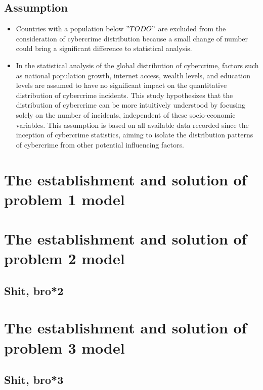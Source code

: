 \documentclass[12pt]{article}
\begin{document}
	\subsection{Assumption}\label{subsec:assumption} %
		\begin{itemize}
			\item Countries with a population below \( "TODO" \) are excluded from the consideration of cybercrime distribution because
				a small change of number could bring a significant difference to statistical analysis.
			\item In the statistical analysis of the global distribution of cybercrime,
				factors such as national population growth, internet access, wealth levels, and education levels
				are assumed to have no significant impact on the quantitative distribution of cybercrime incidents.
				This study hypothesizes that the distribution of cybercrime can be more intuitively understood by focusing solely on the number of incidents,
				independent of these socio-economic variables.
				This assumption is based on all available data recorded since the inception of cybercrime statistics,
				aiming to isolate the distribution patterns of cybercrime from other potential influencing factors.
		\end{itemize}

\section{The establishment and solution of problem 1 model}\label{sec:the-establishment-and-solution-of-problem-1-model}


\section{The establishment and solution of problem 2 model}\label{sec:the-establishment-and-solution-of-problem-2-model} %
	\subsection{Shit, bro*2}\label{subsec:shit-bro*2} %
	
\section{The establishment and solution of problem 3 model}\label{sec:the-establishment-and-solution-of-problem-3-model} %
	\subsection{Shit, bro*3}\label{subsec:shit-bro*3} %
	
\end{document}

